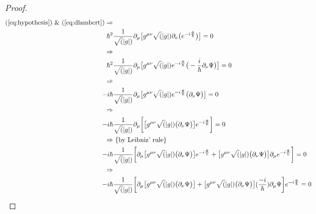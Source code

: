 \documentclass[]{article}
\begin{document}
\begin{proof}
\begin{align*}
	\text{(\ref{eq:hypothesis}) \& (\ref{eq:dlambert})} \Rightarrow&\\
	\hbar^2& \frac{1}{\sqrt(|g|)} \partial_{\mu}\big[ g^{\mu\nu}\sqrt(|g|)\partial_{\nu}\big(e^{-i\frac{\Psi}{\hbar}}\big)\big]=0\\
	\Rightarrow&\\
	\hbar^2& \frac{1}{\sqrt(|g|)} \partial_{\mu}\big[ g^{\mu\nu}\sqrt(|g|)e^{-i\frac{\Psi}{\hbar}}\big(-\frac{i}{\hbar}\partial_{\nu}\Psi\big)\big]=0\\
	\Rightarrow&\\
	-i \hbar& \frac{1}{\sqrt(|g|)} \partial_{\mu}\big[ g^{\mu\nu}\sqrt(|g|)e^{-i\frac{\Psi}{\hbar}}\big(\partial_{\nu}\Psi\big)\big]=0\\
	\Rightarrow&\\
	-i \hbar& \frac{1}{\sqrt(|g|)} \partial_{\mu}\bigg[\big[g^{\mu\nu}\sqrt(|g|)\big(\partial_{\nu}\Psi\big)\big] e^{-i\frac{\Psi}{\hbar}}\bigg]=0 \\
	\Rightarrow& \text{ \{by Leibniz' rule\}}\\
	-i \hbar& \frac{1}{\sqrt(|g|)} \bigg[\partial_{\mu}\big[g^{\mu\nu}\sqrt(|g|)\big(\partial_{\nu}\Psi\big)\big] e^{-i\frac{\Psi}{\hbar}} + \big[g^{\mu\nu}\sqrt(|g|)\big(\partial_{\nu}\Psi\big)\big] \partial_{\mu}e^{-i\frac{\Psi}{\hbar}}\bigg]=0 \\
	\Rightarrow&\\
	-i \hbar& \frac{1}{\sqrt(|g|)} \bigg[\partial_{\mu}\big[g^{\mu\nu}\sqrt(|g|)\big(\partial_{\nu}\Psi\big)\big]  + \big[g^{\mu\nu}\sqrt(|g|)\big(\partial_{\nu}\Psi\big)\big](\frac{-i}{\hbar}) \partial_{\mu}\Psi\bigg]e^{-i\frac{\Psi}{\hbar}}=0
\end{align*}	


\end{proof}
\end{document}
